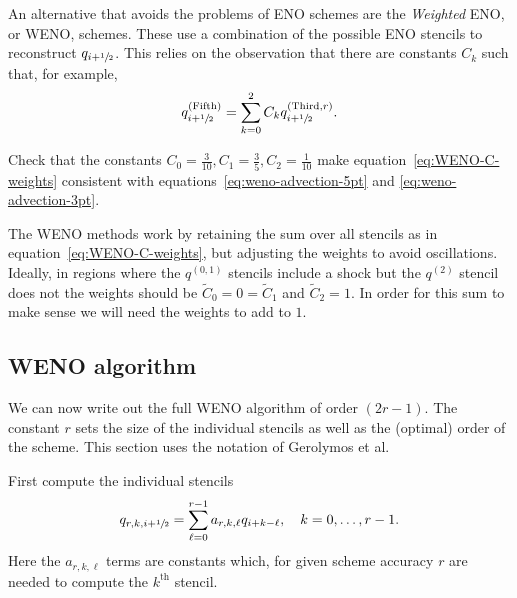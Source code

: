 An alternative that avoids the problems of ENO schemes are the \emph{Weighted}
ENO, or WENO, schemes. These use a combination of the possible ENO stencils to
reconstruct $q_{i+{\sfrac{1}{2}}}$. This relies on the observation that there are
constants $C_k$ such that, for example,
\begin{equation}
  \label{eq:WENO-C-weights}
  q^{(\text{Fifth})}_{i+{\sfrac{1}{2}}} = \sum_{k=0}^{2} C_k q^{(\text{Third}, r)}_{i+{\sfrac{1}{2}}}.
\end{equation}

\begin{exercise}
{Check that the constants $C_0 = \tfrac{3}{10}, C_1 = \tfrac{3}{5}, C_2 =
\tfrac{1}{10}$ make equation~\eqref{eq:WENO-C-weights} consistent with
equations~\eqref{eq:weno-advection-5pt} and \eqref{eq:weno-advection-3pt}.}
\end{exercise}

The WENO methods work by retaining the sum over all stencils as in
equation~\eqref{eq:WENO-C-weights}, but adjusting the weights to avoid
oscillations. Ideally, in regions where the $q^{(0,1)}$ stencils include a
shock but the $q^{(2)}$ stencil does not the weights should be $\tilde{C}_0 = 0
= \tilde{C}_1$ and $\tilde{C}_2 = 1$. In order for this sum to make sense we
will need the weights to add to $1$.

\subsection{WENO algorithm}

We can now write out the full WENO algorithm of order $(2 r - 1)$. The constant
$r$ sets the size of the individual stencils as well as the (optimal) order of
the scheme. This section uses the notation of Gerolymos et al.

First compute the individual stencils
\begin{equation}
  \label{eq:weno-stencils}
  q_{r, k, i+{\sfrac{1}{2}}} = \sum_{\ell=0}^{r-1} a_{r, k, \ell} q_{i+k-\ell}, \quad k = 0, \dots, r-1.
\end{equation}
Here the $a_{r, k, \ell}$ terms are constants which, for given scheme accuracy
$r$ are needed to compute the $k^{\text{th}}$ stencil.

